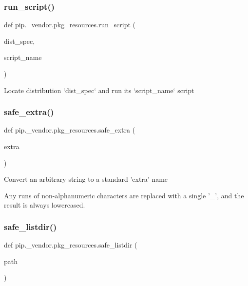 \subsubsection{\texorpdfstring{run\+\_\+script()}{run\_script()}}
{\footnotesize\ttfamily def pip.\+\_\+vendor.\+pkg\+\_\+resources.\+run\+\_\+script (\begin{DoxyParamCaption}\item[{}]{dist\+\_\+spec,  }\item[{}]{script\+\_\+name }\end{DoxyParamCaption})}

\begin{DoxyVerb}Locate distribution `dist_spec` and run its `script_name` script\end{DoxyVerb}
 \mbox{\label{namespacepip_1_1__vendor_1_1pkg__resources_a0fca90e72770561adb5c1feb0ebfd60d}} 
\subsubsection{\texorpdfstring{safe\+\_\+extra()}{safe\_extra()}}
{\footnotesize\ttfamily def pip.\+\_\+vendor.\+pkg\+\_\+resources.\+safe\+\_\+extra (\begin{DoxyParamCaption}\item[{}]{extra }\end{DoxyParamCaption})}

\begin{DoxyVerb}Convert an arbitrary string to a standard 'extra' name

Any runs of non-alphanumeric characters are replaced with a single '_',
and the result is always lowercased.
\end{DoxyVerb}
 \mbox{\label{namespacepip_1_1__vendor_1_1pkg__resources_a58ffc9484616bc8036f165b155a84a89}} 
\subsubsection{\texorpdfstring{safe\+\_\+listdir()}{safe\_listdir()}}
{\footnotesize\ttfamily def pip.\+\_\+vendor.\+pkg\+\_\+resources.\+safe\+\_\+listdir (\begin{DoxyParamCaption}\item[{}]{path }\end{DoxyParamCaption})}


